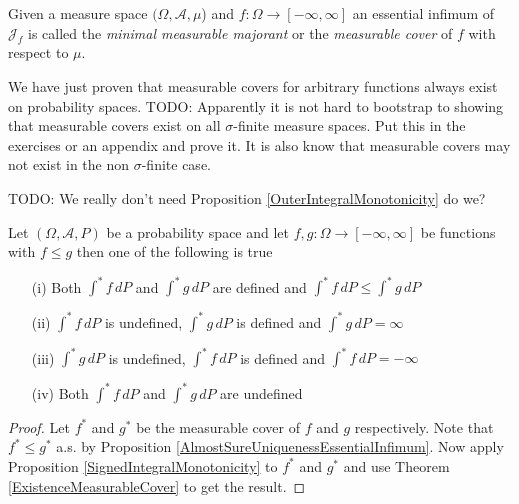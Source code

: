 \begin{defn}Given a measure space $(\Omega, \mathcal{A}, \mu$) and $f : \Omega \to [-\infty, \infty]$ an essential infimum of $\mathcal{J}_f$ is called the \emph{minimal measurable majorant} or the \emph{measurable cover} of $f$ with respect to $\mu$.
\end{defn}
We have just proven that measurable covers for arbitrary functions always exist on probability spaces.  TODO: Apparently it is not hard to bootstrap to showing that measurable covers exist on all $\sigma$-finite measure spaces.  Put this in the exercises or an appendix and prove it.  It is also know that measurable covers may not exist in the non $\sigma$-finite case.

TODO: We really don't need Proposition \ref{OuterIntegralMonotonicity} do we?
\begin{prop}\label{OuterExpectationMonotonicity}Let $(\Omega, \mathcal{A}, P)$ be a probability space and let $f,g: \Omega \to [-\infty, \infty]$ be functions with
$f \leq g$ then one of the following is true
\begin{itemize}
\item[(i)]Both $\int^* f \, dP$ and $\int^* g \, dP$ are defined and $\int^* f \, dP \leq \int^* g \, dP$
\item[(ii)]$\int^* f \, dP$ is undefined, $\int^* g \, dP$ is defined and $\int^* g \, dP = \infty$
\item[(iii)]$\int^* g \, dP$ is undefined, $\int^* f \, dP$ is defined and $\int^* f \, dP = -\infty$
\item[(iv)]Both $\int^* f \, dP$ and $\int^* g \, dP$ are undefined
\end{itemize}
\end{prop}
\begin{proof}
Let $f^*$ and $g^*$ be the measurable cover of $f$ and $g$ respectively.  Note that $f^* \leq g^*$ a.s. by Proposition \ref{AlmostSureUniquenessEssentialInfimum}.  Now apply   Proposition \ref{SignedIntegralMonotonicity} to $f^*$ and $g^*$ and use Theorem \ref{ExistenceMeasurableCover} to get the result.
\end{proof}

